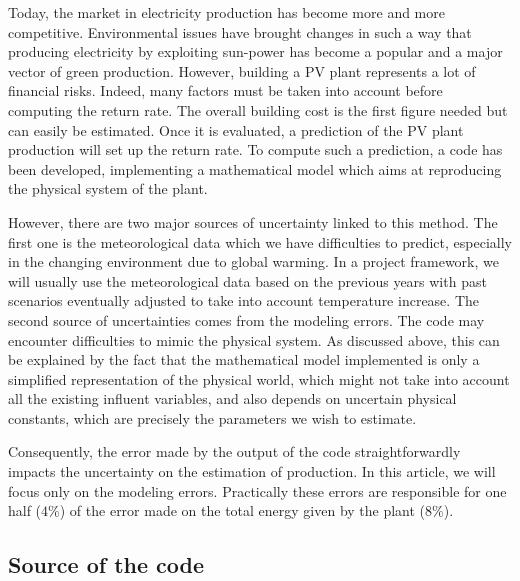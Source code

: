 \documentclass[soumission]{jsfds}
\begin{document}
Today, the market in electricity production has become more and more competitive. Environmental issues have brought changes in such a way that producing electricity by exploiting sun-power has become a popular and a major vector of green production. However, building a PV plant represents a lot of financial risks. Indeed, many factors must be taken into account before computing the return rate. The overall building cost is the first figure needed but can easily be estimated. Once it is evaluated, a prediction of the PV plant production will set up the return rate. To compute such a prediction, a code has been developed, implementing a mathematical model which aims at reproducing the physical system of the plant. \newline

However, there are two major sources of uncertainty linked to this method. The first one is the meteorological data which we have difficulties to predict, especially in the changing environment due to global warming. In a project framework, we will usually use the meteorological data based on the previous years with past scenarios eventually adjusted to take into account temperature increase. The second source of uncertainties comes from the modeling errors. The code may encounter difficulties to mimic the physical system. As discussed above, this can be explained by the fact that the mathematical model implemented is only a simplified representation of the physical world, which might not take into account all the existing influent variables, and also depends on uncertain physical constants, which are precisely the parameters we wish to estimate. \newline

Consequently, the error made by the output of the code straightforwardly impacts the uncertainty on the estimation of production. In this article, we will focus only on the modeling errors. Practically these errors are responsible for one half ($4\%$) of the error made on the total energy given by the plant ($8\%$).

\subsection{Source of the code}
\end{document}
